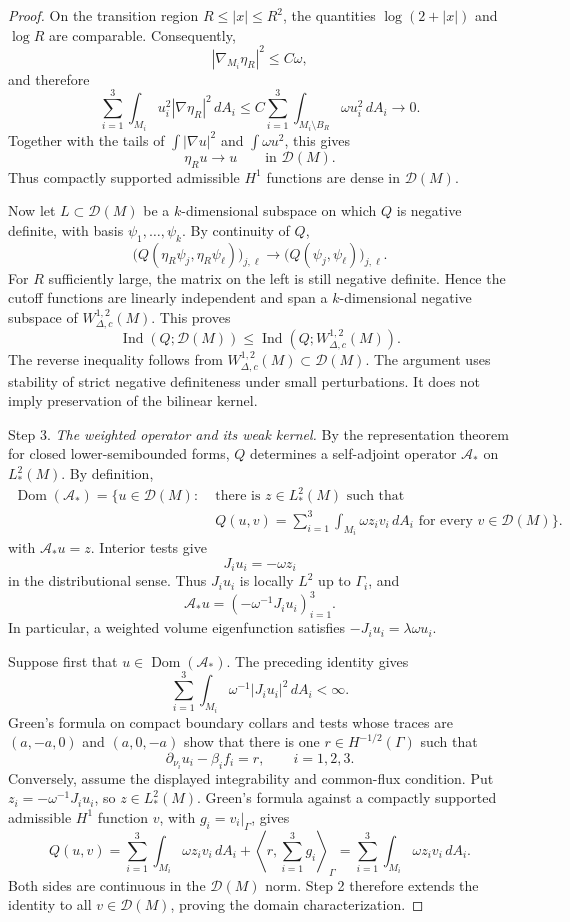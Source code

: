 \documentclass[11pt,twoside]{amsart}
\numberwithin{equation}{section}
\begin{document}
\begin{proof}
On the transition region $R\le |x|\le R^2$, the quantities $\log(2+|x|)$ and $\log R$ are comparable. Consequently,
\[
|\nabla_{M_i}\eta_R|^2\le C\omega,
\]
and therefore
\[
\sum_{i=1}^3\int_{M_i}u_i^2|\nabla\eta_R|^2\,dA_i
\le
C\sum_{i=1}^3\int_{M_i\setminus B_R}\omega u_i^2\,dA_i
\longrightarrow0.
\]
Together with the tails of $\int|\nabla u|^2$ and $\int\omega u^2$, this gives
\[
\eta_Ru\longrightarrow u\qquad\text{in }\mathcal D(M).
\]
Thus compactly supported admissible $H^1$ functions are dense in $\mathcal D(M)$.

Now let $L\subset\mathcal D(M)$ be a $k$-dimensional subspace on which $Q$ is negative definite, with basis $\psi_1,\ldots,\psi_k$. By continuity of $Q$,
\[
\bigl(Q(\eta_R\psi_j,\eta_R\psi_\ell)\bigr)_{j,\ell}
\longrightarrow
\bigl(Q(\psi_j,\psi_\ell)\bigr)_{j,\ell}.
\]
For $R$ sufficiently large, the matrix on the left is still negative definite. Hence the cutoff functions are linearly independent and span a $k$-dimensional negative subspace of $W_{\Delta,c}^{1,2}(M)$. This proves
\[
\operatorname{Ind}(Q;\mathcal D(M))
\le
\operatorname{Ind}(Q;W_{\Delta,c}^{1,2}(M)).
\]
The reverse inequality follows from $W_{\Delta,c}^{1,2}(M)\subset\mathcal D(M)$. The argument uses stability of strict negative definiteness under small perturbations. It does not imply preservation of the bilinear kernel.

\medskip
\noindent Step 3. \emph{The weighted operator and its weak kernel.}
By the representation theorem for closed lower-semibounded forms, $Q$ determines a self-adjoint operator $\mathscr A_*$ on $L_*^2(M)$. By definition,
\[
\begin{split}
\operatorname{Dom}(\mathscr A_*)
=\bigl\{u\in\mathcal D(M):\;&\text{there is }z\in L_*^2(M)\text{ such that}\\
&Q(u,v)=\sum_{i=1}^3\int_{M_i}\omega z_i v_i\,dA_i
\text{ for every }v\in\mathcal D(M)\bigr\}.
\end{split}
\]
with $\mathscr A_*u=z$. Interior tests give
\[
J_i u_i=-\omega z_i
\]
in the distributional sense. Thus $J_i u_i$ is locally $L^2$ up to $\Gamma_i$, and
\[
\mathscr A_*u=(-\omega^{-1}J_i u_i)_{i=1}^3.
\]
In particular, a weighted volume eigenfunction satisfies $-J_i u_i=\lambda\omega u_i$.

Suppose first that $u\in\operatorname{Dom}(\mathscr A_*)$. The preceding identity gives
\[
\sum_{i=1}^3\int_{M_i}\omega^{-1}|J_i u_i|^2\,dA_i<\infty.
\]
Green's formula on compact boundary collars and tests whose traces are $(a,-a,0)$ and $(a,0,-a)$ show that there is one $r\in H^{-1/2}(\Gamma)$ such that
\[
\partial_{\nu_i}u_i-\beta_i f_i=r,
\qquad i=1,2,3.
\]
Conversely, assume the displayed integrability and common-flux condition. Put $z_i=-\omega^{-1}J_i u_i$, so $z\in L_*^2(M)$. Green's formula against a compactly supported admissible $H^1$ function $v$, with $g_i=v_i|_\Gamma$, gives
\[
Q(u,v)
=
\sum_{i=1}^3\int_{M_i}\omega z_i v_i\,dA_i
+
\left\langle r,\sum_{i=1}^3g_i\right\rangle_\Gamma
=
\sum_{i=1}^3\int_{M_i}\omega z_i v_i\,dA_i.
\]
Both sides are continuous in the $\mathcal D(M)$ norm. Step 2 therefore extends the identity to all $v\in\mathcal D(M)$, proving the domain characterization.


\end{proof}
\end{document}
